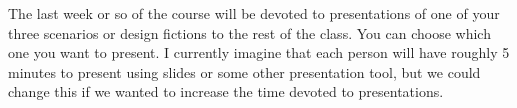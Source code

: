 \documentclass[letterpaper]{inzane_syllabus} %
\begin{document}
The last week or so of the course will be devoted to presentations of one of
your three scenarios or design fictions to the rest of the class.  You can choose which one
you want to present. I currently imagine that each person will have roughly 5
minutes to present using slides or some other presentation tool, but we could
change this if we wanted to increase the time devoted to presentations.


%   
%   
%   
%   
%   
%   
%   
\end{document}
